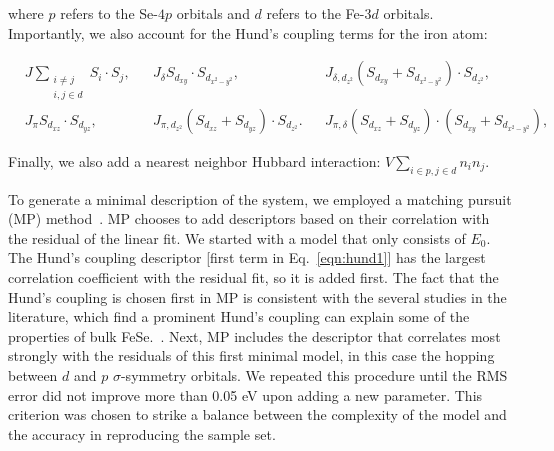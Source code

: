 where $p$ refers to the Se-$4p$ orbitals and $d$ refers to the Fe-$3d$ orbitals. 
Importantly, we also account for the Hund's coupling terms for the iron atom:

\begin{align}
  &J \sum_{\substack{i\ne j \\i,j \in d}} S_i \cdot S_j,&
  &J_{\delta} S_{d_{xy}} \cdot S_{d_{x^2-y^2}},&
  &J_{\delta,d_{z^2}} (S_{d_{xy}} + S_{d_{x^2-y^2}}) \cdot S_{d_{z^2}},& \label{eqn:hund1}
  \nonumber \\
  &J_{\pi} S_{d_{xz}} \cdot S_{d_{yz}},&
  &J_{\pi,d_{z^2}} (S_{d_{xz}} + S_{d_{yz}}) \cdot S_{d_{z^2}}.&
  &J_{\pi,\delta} (S_{d_{xz}} + S_{d_{yz}}) \cdot (S_{d_{xy}} + S_{d_{x^2-y^2}}),&
\end{align}

Finally, we also add a nearest neighbor Hubbard interaction: $V \sum_{i\in p, j\in d} n_{i} n_j$.

To generate a minimal description of the system, we employed a matching pursuit (MP) method~\cite{MP_Zhang1993}.
MP chooses to add descriptors based on their correlation with the residual of the linear fit. 
We started with a model that only consists of $E_0$. The Hund's coupling descriptor [first term in Eq.~\eqref{eqn:hund1}]
has the largest correlation coefficient with the residual fit, so it is added first. The fact that the Hund's coupling is chosen first in MP 
is consistent with the several studies in the literature, which find a prominent Hund's coupling can explain some 
of the properties of bulk FeSe.~\cite{demedici_hunds_2011,de_medici_janus-faced_2011,georges_strong_2013,busemeyer_competing_2016}. 
Next, MP includes the descriptor that correlates most strongly with the residuals of this first minimal model, in this case the hopping between $d$ and $p$ $\sigma$-symmetry orbitals. 
We repeated this procedure until the RMS error did not improve more than 0.05 eV upon adding a new parameter.
This criterion was chosen to strike a balance between the complexity of the model and the accuracy in reproducing the sample set.


